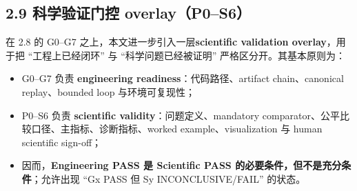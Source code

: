 \documentclass[UTF8]{ctexart}
\begin{document}
\subsection*{2.9 科学验证门控 overlay（P0--S6）}
在 2.8 的 G0--G7 之上，本文进一步引入一层\textbf{scientific validation overlay}，用于把 ``工程上已经闭环'' 与 ``科学问题已经被证明'' 严格区分开。其基本原则为：
\begin{itemize}
\item G0--G7 负责 \textbf{engineering readiness}：代码路径、artifact chain、canonical replay、bounded loop 与环境可复现性；
\item P0--S6 负责 \textbf{scientific validity}：问题定义、mandatory comparator、公平比较口径、主指标、诊断指标、worked example、visualization 与 human scientific sign-off；
\item 因而，\textbf{Engineering PASS 是 Scientific PASS 的必要条件，但不是充分条件}；允许出现 ``Gx PASS 但 Sy INCONCLUSIVE/FAIL'' 的状态。
\end{itemize}
\end{document}
